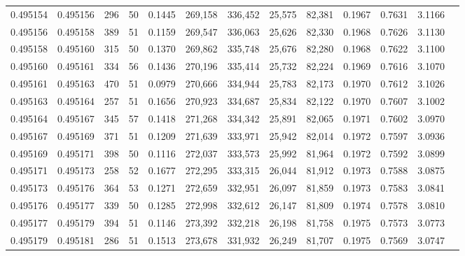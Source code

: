 \begin{tabular}{rrrrrrrrrrrrr}
0.495154 & 0.495156 &   296 &  50 &                                     0.1445 & 269,158 & 336,452 &  25,575 &  82,381 & 0.1967 & 0.7631 & 3.1166 \\
0.495156 & 0.495158 &   389 &  51 &                                     0.1159 & 269,547 & 336,063 &  25,626 &  82,330 & 0.1968 & 0.7626 & 3.1130 \\
0.495158 & 0.495160 &   315 &  50 &                                     0.1370 & 269,862 & 335,748 &  25,676 &  82,280 & 0.1968 & 0.7622 & 3.1100 \\
0.495160 & 0.495161 &   334 &  56 &                                     0.1436 & 270,196 & 335,414 &  25,732 &  82,224 & 0.1969 & 0.7616 & 3.1070 \\
0.495161 & 0.495163 &   470 &  51 &                                     0.0979 & 270,666 & 334,944 &  25,783 &  82,173 & 0.1970 & 0.7612 & 3.1026 \\
0.495163 & 0.495164 &   257 &  51 &                                     0.1656 & 270,923 & 334,687 &  25,834 &  82,122 & 0.1970 & 0.7607 & 3.1002 \\
0.495164 & 0.495167 &   345 &  57 &                                     0.1418 & 271,268 & 334,342 &  25,891 &  82,065 & 0.1971 & 0.7602 & 3.0970 \\
0.495167 & 0.495169 &   371 &  51 &                                     0.1209 & 271,639 & 333,971 &  25,942 &  82,014 & 0.1972 & 0.7597 & 3.0936 \\
0.495169 & 0.495171 &   398 &  50 &                                     0.1116 & 272,037 & 333,573 &  25,992 &  81,964 & 0.1972 & 0.7592 & 3.0899 \\
0.495171 & 0.495173 &   258 &  52 &                                     0.1677 & 272,295 & 333,315 &  26,044 &  81,912 & 0.1973 & 0.7588 & 3.0875 \\
0.495173 & 0.495176 &   364 &  53 &                                     0.1271 & 272,659 & 332,951 &  26,097 &  81,859 & 0.1973 & 0.7583 & 3.0841 \\
0.495176 & 0.495177 &   339 &  50 &                                     0.1285 & 272,998 & 332,612 &  26,147 &  81,809 & 0.1974 & 0.7578 & 3.0810 \\
0.495177 & 0.495179 &   394 &  51 &                                     0.1146 & 273,392 & 332,218 &  26,198 &  81,758 & 0.1975 & 0.7573 & 3.0773 \\
0.495179 & 0.495181 &   286 &  51 &                                     0.1513 & 273,678 & 331,932 &  26,249 &  81,707 & 0.1975 & 0.7569 & 3.0747 \\

\end{tabular}
